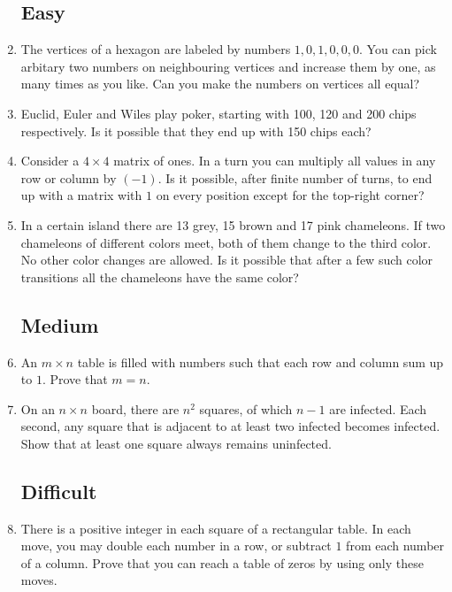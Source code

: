 \documentclass[11pt,a5paper]{article}
\begin{document}
\begin{enumerate}
	\subsection*{Easy}	
	
	\item{The vertices of a hexagon are labeled by numbers $1, 0, 1, 0, 0, 0$. You can pick arbitary two numbers on neighbouring vertices and increase them by one, as many times as you like. Can you make the numbers on vertices all equal?}
	
	\item{Euclid, Euler and Wiles play poker, starting with 100, 120 and 200 chips respectively. Is it possible that they end up with 150 chips each?}
	
	\item{Consider a $4\times 4$ matrix of ones. In a turn you can  multiply all values in any row or column by $(-1)$. Is it possible, after finite number of turns, to end up with a matrix with $1$ on every position except for the top-right corner?}
		
	\item{In a certain island there are 13 grey, 15 brown and 17 pink chameleons. If two chameleons of different colors meet, both of them change to the third color. No other color changes are allowed. Is it possible that after a few such color transitions all the chameleons have the same color?}
	
	\subsection*{Medium}
	
	\item{An $m\times n$ table is filled with numbers such that each row and column sum up to $1$. Prove
that $m = n$.}
	
	\item{On an $n\times n$ board, there are $n^{2}$ squares, of which $n - 1$ are infected. Each second, any square that is adjacent to at least two infected becomes infected. Show that at least one square always remains uninfected.}
	
	\subsection*{Difficult}
	
	\item{There is a positive integer in each square of a rectangular table. In each move, you may double
each number in a row, or subtract $1$ from each number of a column. Prove that you can reach a table of zeros by using only these moves.}
	

\end{enumerate}
\end{document}
